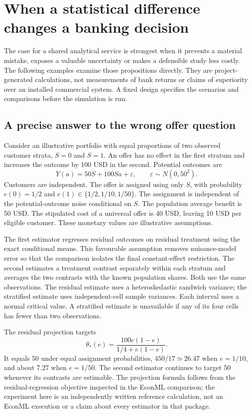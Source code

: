 \chapter{When a statistical difference changes a banking decision}
\label{scisyn:evidence}

The case for a shared analytical service is strongest when it prevents a
material mistake, exposes a valuable uncertainty or makes a defensible study
less costly. The following examples examine those propositions directly.
They are project-generated calculations, not measurements of bank returns or
claims of superiority over an installed commercial system. A fixed design
specifies the scenarios and comparisons before the simulation is run.

\section{A precise answer to the wrong offer question}
Consider an illustrative portfolio with equal proportions of two observed
customer strata, $S=0$ and $S=1$. An offer has no effect in the first stratum
and increases the outcome by 100 USD in the second. Potential outcomes are
\[
 Y(a)=50S+100Sa+\varepsilon,\qquad \varepsilon\sim N(0,50^2).
\]
Customers are independent. The offer is assigned using only $S$, with probability
$e(0)=1/2$ and $e(1)\in\{1/2,1/10,1/50\}$. The assignment is independent of
the potential-outcome noise conditional on $S$. The population average benefit
is 50 USD. The stipulated cost of a universal offer is 40 USD, leaving 10 USD
per eligible customer. These monetary values are illustrative assumptions.

The first estimator regresses residual outcomes on residual treatment using
the exact conditional means. This favourable assumption removes nuisance-model
error so that the comparison isolates the final constant-effect restriction.
The second estimates a treatment contrast separately within each stratum and
averages the two contrasts with the known population shares. Both use the same
observations. The residual estimate uses a heteroskedastic sandwich variance;
the stratified estimate uses independent-cell sample variances. Each interval
uses a normal critical value. A stratified estimate is unavailable if any of
its four cells has fewer than two observations.

The residual projection targets
\[
 \theta_*(e)=\frac{100e(1-e)}{1/4+e(1-e)}.
\]
It equals 50 under equal assignment probabilities, $450/17\simeq26.47$ when
$e=1/10$, and about 7.27 when $e=1/50$. The second estimator continues to target
50 whenever its contrasts are estimable. The projection formula follows from
the residual-regression objective inspected in the EconML comparison; the
experiment here is an independently written reference calculation, not an
EconML execution or a claim about every estimator in that package.
\citep{exec19_econml_source}


